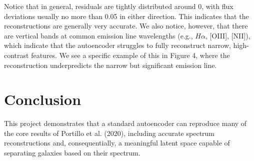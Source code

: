 \documentclass[11pt]{article}
\begin{document}
Notice that in general, residuals are tightly distributed around 0, with flux deviations usually no more than 0.05 in either direction. This indicates that the reconstructions are generally very accurate. We also notice, however, that there are vertical bands at common emission line wavelengths (e.g., $H\alpha$, [OIII], [NII]), which indicate that the autoencoder struggles to fully reconstruct narrow, high-contrast features. We see a specific example of this in Figure 4, where the reconstruction underpredicts the narrow but significant emission line.

\section{Conclusion}
This project demonstrates that a standard autoencoder can reproduce many of the core results of Portillo et al. (2020), including accurate spectrum reconstructions and, consequentially, a meaningful latent space capable of separating galaxies based on their spectrum. 



\end{document}
